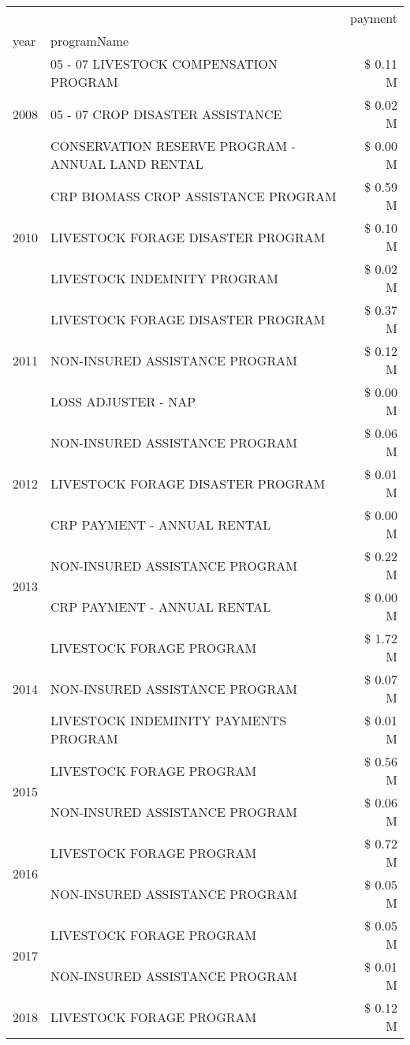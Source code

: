 \begin{tabular}{llr}
\toprule
 &  & payment \\
year & programName &  \\
\midrule
\multirow[t]{3}{*}{2008} & 05 - 07 LIVESTOCK COMPENSATION PROGRAM & \$ 0.11 M \\
 & 05 - 07 CROP DISASTER ASSISTANCE & \$ 0.02 M \\
 & CONSERVATION RESERVE PROGRAM - ANNUAL LAND RENTAL & \$ 0.00 M \\
\cline{1-3}
\multirow[t]{3}{*}{2010} & CRP BIOMASS CROP ASSISTANCE PROGRAM & \$ 0.59 M \\
 & LIVESTOCK FORAGE DISASTER PROGRAM & \$ 0.10 M \\
 & LIVESTOCK INDEMNITY PROGRAM & \$ 0.02 M \\
\cline{1-3}
\multirow[t]{3}{*}{2011} & LIVESTOCK FORAGE DISASTER PROGRAM & \$ 0.37 M \\
 & NON-INSURED ASSISTANCE PROGRAM & \$ 0.12 M \\
 & LOSS ADJUSTER - NAP & \$ 0.00 M \\
\cline{1-3}
\multirow[t]{3}{*}{2012} & NON-INSURED ASSISTANCE PROGRAM & \$ 0.06 M \\
 & LIVESTOCK FORAGE DISASTER PROGRAM & \$ 0.01 M \\
 & CRP PAYMENT - ANNUAL RENTAL & \$ 0.00 M \\
\cline{1-3}
\multirow[t]{2}{*}{2013} & NON-INSURED ASSISTANCE PROGRAM & \$ 0.22 M \\
 & CRP PAYMENT - ANNUAL RENTAL & \$ 0.00 M \\
\cline{1-3}
\multirow[t]{3}{*}{2014} & LIVESTOCK FORAGE PROGRAM & \$ 1.72 M \\
 & NON-INSURED ASSISTANCE PROGRAM & \$ 0.07 M \\
 & LIVESTOCK INDEMINITY PAYMENTS PROGRAM & \$ 0.01 M \\
\cline{1-3}
\multirow[t]{2}{*}{2015} & LIVESTOCK FORAGE PROGRAM & \$ 0.56 M \\
 & NON-INSURED ASSISTANCE PROGRAM & \$ 0.06 M \\
\cline{1-3}
\multirow[t]{2}{*}{2016} & LIVESTOCK FORAGE PROGRAM & \$ 0.72 M \\
 & NON-INSURED ASSISTANCE PROGRAM & \$ 0.05 M \\
\cline{1-3}
\multirow[t]{2}{*}{2017} & LIVESTOCK FORAGE PROGRAM & \$ 0.05 M \\
 & NON-INSURED ASSISTANCE PROGRAM & \$ 0.01 M \\
\cline{1-3}
\multirow[t]{3}{*}{2018} & LIVESTOCK FORAGE PROGRAM & \$ 0.12 M \\

\end{tabular}
